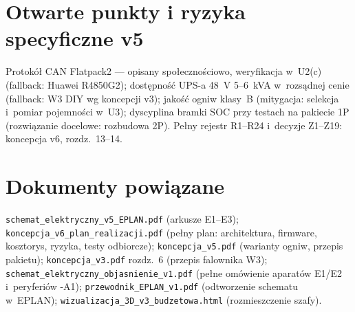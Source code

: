\documentclass[11pt,a4paper]{article}
\begin{document}
\section{Otwarte punkty i ryzyka specyficzne v5}
Protokół CAN Flatpack2 --- opisany społecznościowo, weryfikacja w~U2(c) (fallback: Huawei R4850G2);
dostępność UPS-a 48~V 5--6~kVA w~rozsądnej cenie (fallback: W3 DIY wg koncepcji v3); jakość ogniw klasy~B
(mitygacja: selekcja i~pomiar pojemności w~U3); dyscyplina bramki SOC przy testach na pakiecie 1P
(rozwiązanie docelowe: rozbudowa 2P). Pełny rejestr R1--R24 i~decyzje Z1--Z19: koncepcja v6, rozdz.~13--14.

\section{Dokumenty powiązane}
\texttt{schemat\_elektryczny\_v5\_EPLAN.pdf} (arkusze E1--E3); \texttt{koncepcja\_v6\_plan\_realizacji.pdf}
(pełny plan: architektura, firmware, kosztorys, ryzyka, testy odbiorcze); \texttt{koncepcja\_v5.pdf}
(warianty ogniw, przepis pakietu); \texttt{koncepcja\_v3.pdf} rozdz.~6 (przepis falownika W3);
\texttt{schemat\_elektryczny\_objasnienie\_v1.pdf} (pełne omówienie aparatów E1/E2 i~peryferiów -A1);
\texttt{przewodnik\_EPLAN\_v1.pdf} (odtworzenie schematu w~EPLAN); \texttt{wizualizacja\_3D\_v3\_budzetowa.html}
(rozmieszczenie szafy).
\end{document}
